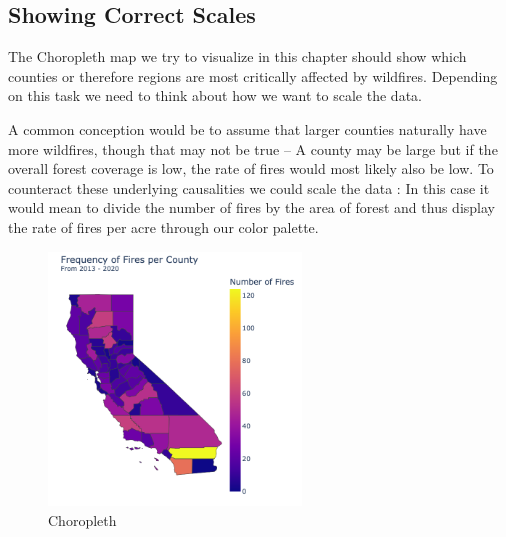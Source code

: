 \subsection*{Showing Correct Scales}
The Choropleth map we try to visualize in this chapter should show which counties or therefore regions are most critically affected by wildfires. Depending on this task we need to think about how we want to scale the data. 

A common conception would be to assume that larger counties naturally have more wildfires, though that may not be true -- A county may be large but if the overall forest coverage is low, the rate of fires would most likely also be low. To counteract these underlying causalities we could scale the data \cite{doughertyNormalizeChoroplethMap2021}: In this case it would mean to divide the number of fires by the area of forest and thus display the rate of fires per acre through our color palette.

\begin{figure}[h]
    \centering
    \includegraphics[width=0.6\textwidth]{Images/choropleth.png}
    \caption{Choropleth}
    \label{fig:enter-label}
\end{figure}